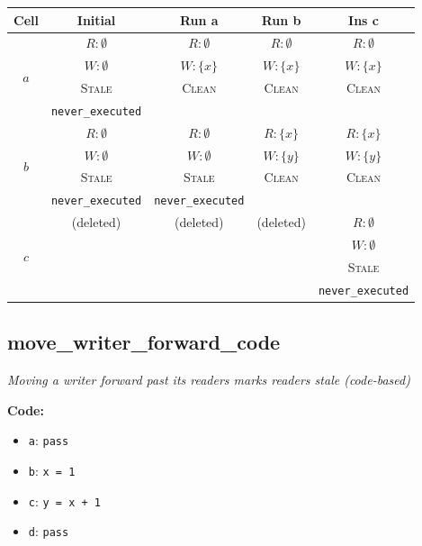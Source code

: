 \documentclass{article}
\begin{document}
\begin{center}
\small
\begin{tabular}{|c|c|c|c|c|}
\hline
\textbf{Cell} & \textbf{Initial} & \textbf{Run a} & \textbf{Run b} & \textbf{Ins c} \\
\hline
\multirow{4}{*}{$a$}
  & $R: \emptyset$ & $R: \emptyset$ & $R: \emptyset$ & $R: \emptyset$ \\
  & $W: \emptyset$ & $W: \{x\}$ & $W: \{x\}$ & $W: \{x\}$ \\
  & \textsc{Stale} & \textsc{Clean} & \textsc{Clean} & \textsc{Clean} \\
  & \footnotesize\texttt{never\_executed} &  &  &  \\
\hline
\multirow{4}{*}{$b$}
  & $R: \emptyset$ & $R: \emptyset$ & $R: \{x\}$ & $R: \{x\}$ \\
  & $W: \emptyset$ & $W: \emptyset$ & $W: \{y\}$ & $W: \{y\}$ \\
  & \textsc{Stale} & \textsc{Stale} & \textsc{Clean} & \textsc{Clean} \\
  & \footnotesize\texttt{never\_executed} & \footnotesize\texttt{never\_executed} &  &  \\
\hline
\multirow{4}{*}{$c$}
  & (deleted) & (deleted) & (deleted) & $R: \emptyset$ \\
  &  &  &  & $W: \emptyset$ \\
  &  &  &  & \textsc{Stale} \\
  &  &  &  & \footnotesize\texttt{never\_executed} \\
\hline
\end{tabular}
\end{center}


\subsection{move\_writer\_forward\_code}
\textit{Moving a writer forward past its readers marks readers stale (code-based)}

\textbf{Code:}
\begin{itemize}
  \item \texttt{a}: \verb|pass|
  \item \texttt{b}: \verb|x = 1|
  \item \texttt{c}: \verb|y = x + 1|
  \item \texttt{d}: \verb|pass|
\end{itemize}
\end{document}
